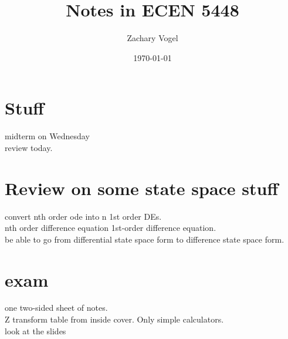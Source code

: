 \documentclass{article}
\author{Zachary Vogel}
\date{\today}
\title{Notes in ECEN 5448}
\begin{document}
\maketitle


\section*{Stuff}
midterm on Wednesday\\
review today.\\

\section*{Review on some state space stuff}
convert nth order ode into n 1st order DEs.\\
nth order difference equation 1st-order difference equation.\\
be able to go from differential state space form to difference state space form.\\

\section*{exam}
one two-sided sheet of notes.\\
Z transform table from inside cover. Only simple calculators.\\
look at the slides
\end{document}
